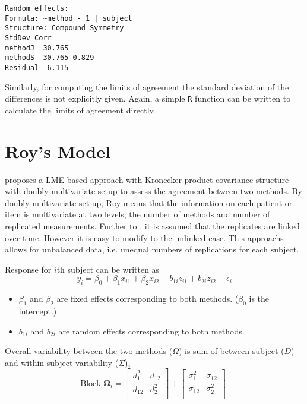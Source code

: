 \begin{framed}
\begin{verbatim}
Random effects:
Formula: ~method - 1 | subject
Structure: Compound Symmetry
StdDev Corr
methodJ  30.765
methodS  30.765 0.829
Residual  6.115
\end{verbatim}
\end{framed}

Similarly, for computing the limits of agreement the standard deviation of the differences is not explicitly given. Again, a simple \texttt{R} function can be written to calculate the limits of agreement directly.

\section{Roy's Model}
\citet{ARoy2009} proposes a LME based approach with Kronecker product covariance structure with doubly multivariate setup to
assess the agreement between two methods. By doubly multivariate set up, Roy means that the information on each patient or item is multivariate at two levels, the number of methods and number of replicated measurements. Further to \citet{lam}, it is assumed that the replicates are linked over time. However it is easy to modify to the unlinked case. This approachs allows for unbalanced data, i.e. unequal numbers of replications for each subject.
 
Response for $i$th subject can be written as
\[ y_i = \beta_0 + \beta_1x_{i1} + \beta_2x_{i2} + b_{1i}z_{i1}  + b_{2i}z_{i2} + \epsilon_i \]
\begin{itemize}
\item $\beta_1$ and $\beta_2$ are fixed effects corresponding to both methods. ($\beta_0$ is the intercept.)
\item $b_{1i}$ and $b_{2i}$ are random effects corresponding to both methods.
\end{itemize}

Overall variability between the two methods ($\Omega$) is sum of between-subject ($D$) and within-subject variability ($\Sigma$),
\[
\mbox{Block } \boldsymbol{\Omega}_i = \left[ \begin{array}{cc} d^2_1 & d_{12}\\ d_{12} & d^2_2\\ \end{array} \right]
+ \left[\begin{array}{cc} \sigma^2_1 & \sigma_{12}\\ \sigma_{12} & \sigma^2_2\\ \end{array}\right].
\]



